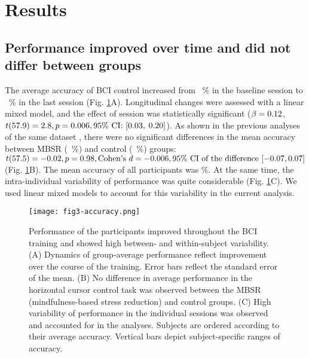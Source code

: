 \section{Results}

\subsection{Performance improved over time and did not differ between groups}

The average accuracy of BCI control increased from \metadataMeanAccuracyFirst~\% in the baseline session to \metadataMeanAccuracyLast~\% in the last session (Fig. \ref{fig:dataset_overview}A). Longitudinal changes were assessed with a linear mixed model, and the effect of session was statistically significant ($\beta = 0.12$, $t(57.9) = 2.8, p = 0.006, 95\%~\text{CI:}~ [0.03,$ $0.20]$). As shown in the previous analyses of the same dataset \citep{Stieger2020_analysis}, there were no significant differences in the mean accuracy between MBSR (\metadataMeanAccuracyMBSR~\%) and control (\metadataMeanAccuracyControl~\%) groups: $t(57.5) = -0.02, p = 0.98, \text{Cohen's}~d = -0.006, 95\% ~\text{CI of the difference}~\allowbreak[-0.07,  0.07]$ (Fig. \ref{fig:dataset_overview}B). The mean accuracy of all participants was \metadataMeanAccuracy\%. At the same time, the intra-individual variability of performance was quite considerable (Fig. \ref{fig:dataset_overview}C). We used linear mixed models to account for this variability in the current analysis.

\begin{figure}[htbp]
    \centering
    \texttt{[image: fig3-accuracy.png]}
    \caption{Performance of the participants improved throughout the BCI training and showed high between- and within-subject variability. (A) Dynamics of group-average performance reflect improvement over the course of the training. Error bars reflect the standard error of the mean. (B) No difference in average performance in the horizontal cursor control task was observed between the MBSR (mindfulness-based stress reduction) and control groups. (C) High variability of performance in the individual sessions was observed and accounted for in the analyses. Subjects are ordered according to their average accuracy. Vertical bars depict subject-specific ranges of accuracy.}
    \label{fig:dataset_overview}
\end{figure}


